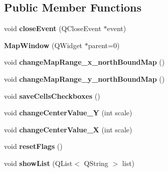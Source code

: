 \subsection*{Public Member Functions}
\begin{DoxyCompactItemize}
\item 
void {\bfseries close\+Event} (Q\+Close\+Event $\ast$event)\hypertarget{class_map_window_aaafdb761ea59fd170e21d75a45c8db61}{}\label{class_map_window_aaafdb761ea59fd170e21d75a45c8db61}

\item 
{\bfseries Map\+Window} (Q\+Widget $\ast$parent=0)\hypertarget{class_map_window_a8600a8f2bafe9128e872f954c0817d58}{}\label{class_map_window_a8600a8f2bafe9128e872f954c0817d58}

\item 
void {\bfseries change\+Map\+Range\+\_\+x\+\_\+north\+Bound\+Map} ()\hypertarget{class_map_window_aef5debd25050cef686c86a28fc87442c}{}\label{class_map_window_aef5debd25050cef686c86a28fc87442c}

\item 
void {\bfseries change\+Map\+Range\+\_\+y\+\_\+north\+Bound\+Map} ()\hypertarget{class_map_window_af18c70d3de9bbcd67d3d3afb812a800f}{}\label{class_map_window_af18c70d3de9bbcd67d3d3afb812a800f}

\item 
void {\bfseries save\+Cells\+Checkboxes} ()\hypertarget{class_map_window_aa6c43e16cf7a6e8b36544dd938ee0a55}{}\label{class_map_window_aa6c43e16cf7a6e8b36544dd938ee0a55}

\item 
void {\bfseries change\+Center\+Value\+\_\+Y} (int scale)\hypertarget{class_map_window_ac275fe0f2351d7aa19e6eaae469e423d}{}\label{class_map_window_ac275fe0f2351d7aa19e6eaae469e423d}

\item 
void {\bfseries change\+Center\+Value\+\_\+X} (int scale)\hypertarget{class_map_window_a09508ceeb6a8d88e230d8b4624f60b6e}{}\label{class_map_window_a09508ceeb6a8d88e230d8b4624f60b6e}

\item 
void {\bfseries reset\+Flags} ()\hypertarget{class_map_window_a7454aacf1c85a4e7cb774d95d6fd9dfa}{}\label{class_map_window_a7454aacf1c85a4e7cb774d95d6fd9dfa}

\item 
void {\bfseries show\+List} (Q\+List$<$ Q\+String $>$ list)\hypertarget{class_map_window_a42b1b893af15ec85f4254e6473c91c73}{}\label{class_map_window_a42b1b893af15ec85f4254e6473c91c73}

\end{DoxyCompactItemize}
